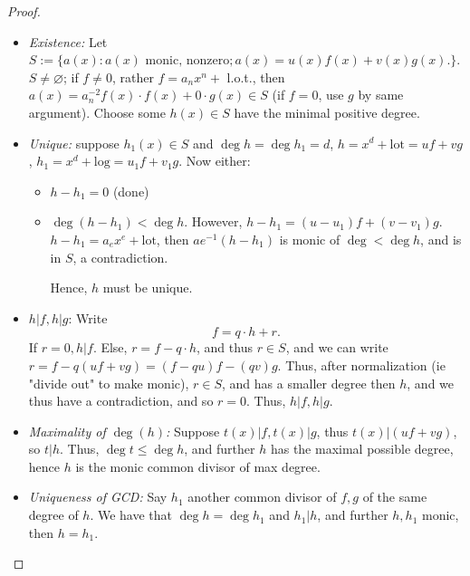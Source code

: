 \documentclass[12pt,oneside]{article}
\begin{document}
\begin{proof}
  \begin{itemize}
    \item \textit{Existence: } Let $S := \{a(x) : a(x) \text{ monic, nonzero}; a(x) = u(x) f(x) + v(x) g(x).\}$. $S \neq \varnothing$; if $f \neq 0$, rather $f = a_n x^{n} + $ l.o.t., then $a(x) = a_{n}^{-2} f(x)\cdot f(x) + 0 \cdot g(x) \in S$ (if $f = 0$, use $g$ by same argument). Choose some $h(x) \in S$ have the minimal positive degree.
  
    \item \textit{Unique: } suppose $h_1(x) \in S$ and $\deg h = \deg h_1 = d$, $h = x^{d} + \text{lot} = uf + vg$, $h_1 = x^{d} + \text{log} = u_1f + v_1g$. Now either:
    \begin{itemize}
      \item $h- h_1 = 0$ (done)
      \item $\deg (h-h_1) < \deg h$. However, $h-h_1 = (u-u_1)f + (v-v_1) g$. $h-h_1 = a_e x^{e} + \text{lot}$, then $ae^{-1}(h-h_1)$ is monic of $\deg < \deg h$, and is in $S$, a contradiction. 
      
      Hence, $h$ must be unique.
    \end{itemize}
    \item $h|f, h|g$: Write \[f = q \cdot h + r.\] If $r = 0, h | f$. Else, $r = f - q \cdot h$, and thus $r \in S$, and we can write $r = f -q (uf + vg) = (f-qu)f - (qv)g$. Thus, after normalization (ie "divide out" to make monic), $r \in S$, and has a smaller degree then $h$, and we thus have a contradiction, and so $r = 0$. Thus, $h | f, h | g$.
    \item \textit{Maximality of $\deg (h)$:} Suppose $t(x) | f, t(x) | g$, thus $t(x) | (uf + vg)$, so $t | h$. Thus, $\deg t \leq \deg h$, and further $h$ has the maximal possible degree, hence $h$ is the monic common divisor of max degree.
    \item \textit{Uniqueness of GCD:} Say $h_1$ another common divisor of $f, g$ of the same degree of $h$. We have that $\deg {h} = \deg{h_1}$ and $h_1 | h$, and further $h, h_1$ monic, then $h = h_1$.
  \end{itemize}
\end{proof}
\end{document}
